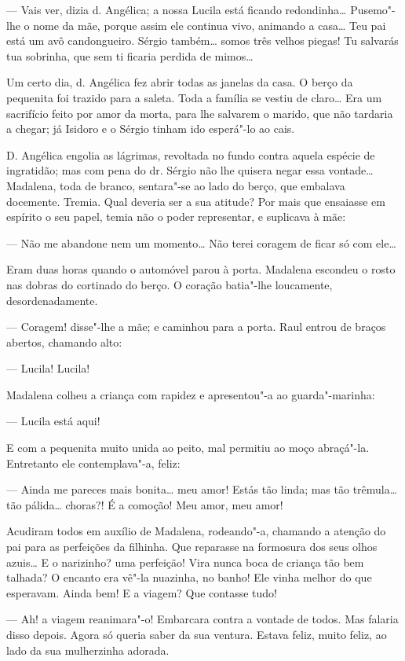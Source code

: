 --- Vais ver, dizia d. Angélica; a nossa Lucila está ficando
redondinha\ldots{} Pusemo"-lhe o nome da mãe, porque assim ele continua vivo,
animando a casa\ldots{} Teu pai está um avô candongueiro. Sérgio também\ldots{}
somos três velhos piegas! Tu salvarás tua sobrinha, que sem ti ficaria
perdida de mimos\ldots{}

Um certo dia, d. Angélica fez abrir todas as janelas da casa. O berço da
pequenita foi trazido para a saleta. Toda a família se vestiu de
claro\ldots{} Era um sacrifício feito por amor da morta, para lhe salvarem o
marido, que não tardaria a chegar; já Isidoro e o Sérgio tinham ido
esperá"-lo ao cais.

D. Angélica engolia as lágrimas, revoltada no fundo contra aquela
espécie de ingratidão; mas com pena do dr. Sérgio não lhe quisera negar
essa vontade\ldots{} Madalena, toda de branco, sentara"-se ao lado do berço,
que embalava docemente. Tremia. Qual deveria ser a sua atitude? Por mais
que ensaiasse em espírito o seu papel, temia não o poder representar, e
suplicava à mãe:

--- Não me abandone nem um momento\ldots{} Não terei coragem de ficar só com
ele\ldots{}

Eram duas horas quando o automóvel parou à porta. Madalena escondeu o
rosto nas dobras do cortinado do berço. O coração batia"-lhe loucamente,
desordenadamente.

--- Coragem! disse"-lhe a mãe; e caminhou para a porta. Raul entrou de
braços abertos, chamando alto:

--- Lucila! Lucila!

Madalena colheu a criança com rapidez e apresentou"-a ao guarda"-marinha:

--- Lucila está aqui!

E com a pequenita muito unida ao peito, mal permitiu ao moço abraçá"-la.
Entretanto ele contemplava"-a, feliz:

--- Ainda me pareces mais bonita\ldots{} meu amor! Estás tão linda; mas tão
trêmula\ldots{} tão pálida\ldots{} choras?! É a comoção! Meu amor, meu amor!

Acudiram todos em auxílio de Madalena, rodeando"-a, chamando a atenção do
pai para as perfeições da filhinha. Que reparasse na formosura dos seus
olhos azuis\ldots{} E o narizinho? uma perfeição! Vira nunca boca de criança
tão bem talhada? O encanto era vê"-la nuazinha, no banho! Ele vinha
melhor do que esperavam. Ainda bem! E a viagem? Que contasse tudo!

--- Ah! a viagem reanimara"-o! Embarcara contra a vontade de todos. Mas
falaria disso depois. Agora só queria saber da sua ventura. Estava
feliz, muito feliz, ao lado da sua mulherzinha adorada.

